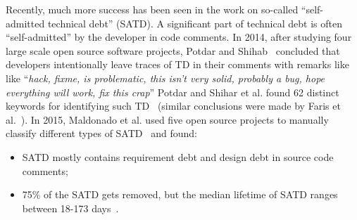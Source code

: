 \documentclass[10pt,conference]{IEEEtran}
\newcommand{\bi}{\begin{itemize}}
\newcommand{\ei}{\end{itemize}}
\begin{document}
Recently, much more success has been seen in the work on so-called ``self-admitted technical debt'' (SATD).
A significant part of technical debt is often ``self-admitted'' by the developer in code comments\cite{potdar2014exploratory}. 
In 2014, after studying four large scale open source software projects, Potdar and Shihab~\cite{potdar2014exploratory} concluded that developers intentionally leave traces of TD in their comments
with remarks like  like ``{\em hack, fixme, is problematic, this isn't very solid, probably a bug, hope everything will work, fix this crap}'' 
Potdar and Shihar et al. found 62 distinct keywords for identifying such TD~\cite{potdar2014exploratory}
(similar conclusions were made   by Faris et al.~\cite{de2015contextualized}).
In 2015, Maldonado et al. used five open source projects to manually classify different types of SATD~\cite{maldonado2015detecting} and found:
\bi
\item
SATD mostly contains requirement debt and design debt in source code comments; 
\item 
75\% of the SATD gets removed, but the median lifetime of SATD ranges between 18-173 days~\cite{maldonado2017empirical}. 
\ei
 
\end{document}
